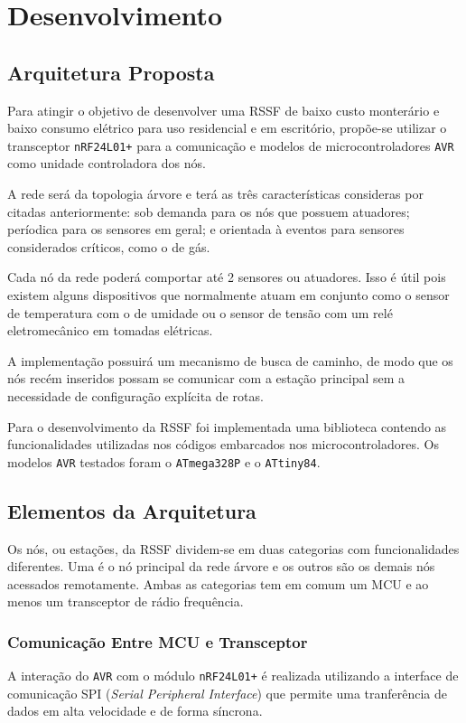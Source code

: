 \chapter{Desenvolvimento}
\label{cap:5}

\section{Arquitetura Proposta}
Para atingir o objetivo de desenvolver uma RSSF de baixo custo monterário e baixo consumo elétrico para uso
residencial e em escritório, propõe-se utilizar o transceptor \texttt{nRF24L01+} para a comunicação e modelos de
microcontroladores \texttt{AVR} como unidade controladora dos nós.

A rede será da topologia árvore e terá as três características consideras por
 citadas anteriormente: sob demanda para os nós que possuem atuadores;
períodica para os sensores em geral; e orientada à eventos para sensores considerados críticos, como o de gás.

Cada nó da rede poderá comportar até 2 sensores ou atuadores. Isso é útil pois existem alguns dispositivos que
normalmente atuam em conjunto como o sensor de temperatura com o de umidade ou o sensor de tensão com um relé
eletromecânico em tomadas elétricas.

A implementação possuirá um mecanismo de busca de caminho, de modo que os nós recém inseridos possam se
comunicar com a estação principal sem a necessidade de configuração explícita de rotas.

Para o desenvolvimento da RSSF foi implementada uma biblioteca contendo as funcionalidades utilizadas nos
códigos embarcados nos microcontroladores. Os modelos \texttt{AVR} testados foram o \texttt{ATmega328P} e o
\texttt{ATtiny84}.

\section{Elementos da Arquitetura}
Os nós, ou estações, da RSSF dividem-se em duas categorias com funcionalidades diferentes. Uma é o nó
principal da rede árvore e os outros são os demais nós acessados remotamente. Ambas as categorias tem em comum
um MCU e ao menos um transceptor de rádio frequência.

\subsection{Comunicação Entre MCU e Transceptor}
A interação do \texttt{AVR} com o módulo \texttt{nRF24L01+} é realizada utilizando a interface de comunicação
SPI (\textit{Serial Peripheral Interface}) que permite uma tranferência de dados em alta velocidade e de forma
síncrona.


